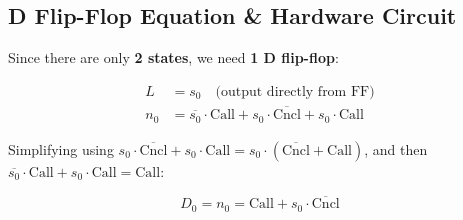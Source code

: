 \documentclass[12pt, a4paper]{article}
\begin{document}
\subsection{D Flip-Flop Equation \& Hardware Circuit}

Since there are only \textbf{2 states}, we need \textbf{1 D flip-flop}:

\begin{align}
  L  &= s_0 \quad \text{(output directly from FF)} \\[6pt]
  n_0 &= \overline{s_0} \cdot \text{Call} + s_0 \cdot \overline{\text{Cncl}} + s_0 \cdot \text{Call}
\end{align}

Simplifying using $s_0 \cdot \overline{\text{Cncl}} + s_0 \cdot \text{Call} = s_0 \cdot (\overline{\text{Cncl}} + \text{Call})$, and then $\overline{s_0} \cdot \text{Call} + s_0 \cdot \text{Call} = \text{Call}$:

\begin{equation}
  \boxed{D_0 = n_0 = \text{Call} + s_0 \cdot \overline{\text{Cncl}}}
\end{equation}
\end{document}
